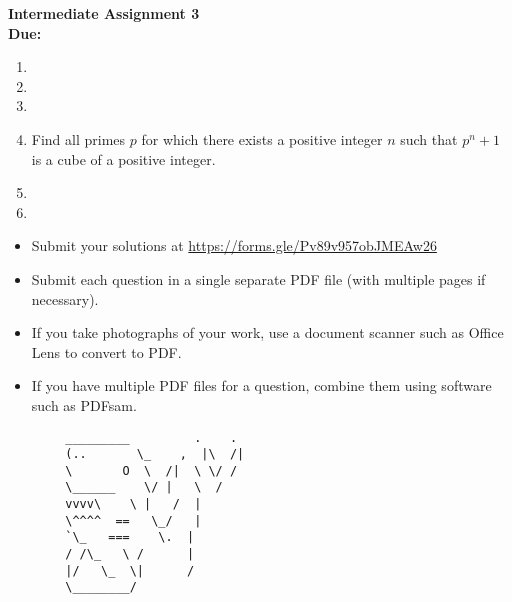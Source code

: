 \documentclass{article}
\begin{document}
	\thispagestyle{empty}
	
	\begin{center}
		\textbf{\Large Intermediate Assignment 3}
		\\ \vspace{1em}
		\textbf{\large Due: }
	\end{center}
	
	\bigskip
	
	\begin{enumerate}[itemsep=12pt]
		
		\item  
		
		
		\item 
		
		
		\item 
		
		
		\item %
		Find all primes $p$ for which there exists a positive integer $n$ such that $p^n+1$ is a cube of a positive integer.
		
		
		\item
		
		
		\item 
		
	\end{enumerate}
	
	
	\vfill
	\small
	\begin{itemize}
		\item Submit your solutions at \href{https://forms.gle/Pv89v957obJMEAw26}{https://forms.gle/Pv89v957obJMEAw26}
		\item Submit each question in a single separate PDF file (with multiple pages if necessary).
		\item If you take photographs of your work, use a document scanner such as Office Lens to convert to PDF.
		\item If you have multiple PDF files for a question, combine them using software such as PDFsam.
	\end{itemize}
	
	\vfill
	\centering
	\small
	\begin{BVerbatim}
		_________         .    .
		(..       \_    ,  |\  /|
		\       O  \  /|  \ \/ /
		\______    \/ |   \  / 
		vvvv\    \ |   /  |
		\^^^^  ==   \_/   |
		`\_   ===    \.  |
		/ /\_   \ /      |
		|/   \_  \|      /
		\________/
	\end{BVerbatim}
	
\end{document}
